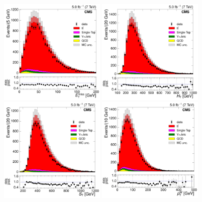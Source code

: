 \begin{figure}[hbtp]
    \centering
     \includegraphics[width=0.45\textwidth]{Chapters/04_Analysis/04b_XSections/images/control_plots/before_fit/7TeV/MuPlusJets_patType1CorrectedPFMet_2orMoreBtags_with_ratio.pdf}\hfill
     \includegraphics[width=0.45\textwidth]{Chapters/04_Analysis/04b_XSections/images/control_plots/before_fit/7TeV/MuPlusJets_HT_2orMoreBtags_with_ratio.pdf}\\
     \includegraphics[width=0.45\textwidth]{Chapters/04_Analysis/04b_XSections/images/control_plots/before_fit/7TeV/MuPlusJets_patType1CorrectedPFMet_ST_2orMoreBtags_with_ratio.pdf}\hfill
     \includegraphics[width=0.45\textwidth]{Chapters/04_Analysis/04b_XSections/images/control_plots/before_fit/7TeV/MuPlusJets_patType1CorrectedPFMet_WPT_2orMoreBtags_with_ratio.pdf}\\

\end{figure}
